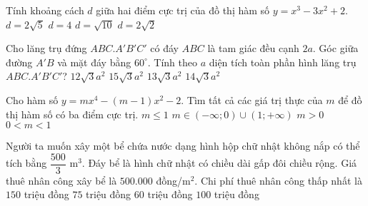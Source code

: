 \begin{ex}%
	Tính khoảng cách $d$ giữa hai điểm cực trị của đồ thị hàm số $y=x^3-3x^2+2$.
	\choice
	{\True $d=2\sqrt{5}$}
	{$d=4$}
	{$d=\sqrt{10}$}
	{$d=2\sqrt{2}$}
\end{ex}

\begin{ex}%
	Cho lăng trụ đứng $ABC.A'B'C'$ có đáy $ABC$ là tam giác đều cạnh $2a$. Góc giữa đường $A'B$ và mặt đáy bằng $60^{\circ}$. Tính theo $a$ diện tích toàn phần hình lăng trụ $ABC.A'B'C'$?
	\choice
	{$12\sqrt{3}a^2$}
	{$15\sqrt{3}a^2$}
	{$13\sqrt{3}a^2$}
	{\True $14\sqrt{3}a^2$}
\end{ex}

\begin{ex}%
	Cho hàm số $y=mx^4-(m-1)x^2-2$. Tìm tất cả các giá trị thực của $m$ để đồ thị hàm số có ba điểm cực trị.
	\choice
	{$m \leq 1$}
	{\True $m \in (-\infty;0) \cup (1;+\infty)$}
	{$m>0$}
	{$0<m<1$}
\end{ex}
 
 
 \begin{ex}%
 	Người ta muốn xây một bể chứa nước dạng hình hộp chữ nhật không nắp có thể tích bằng $\dfrac{500}{3}$ m$^3$. Đáy bể là hình chữ nhật có chiều dài gấp đôi chiều rộng. Giá thuê nhân công xây bể là $500.000$ đồng/m$^2$. Chi phí thuê nhân công thấp nhất là
 	\choice
 	{$150$ triệu đồng}
 	{\True $75$ triệu đồng}
 	{$60$ triệu đồng}
 	{$100$ triệu đồng}
 \end{ex}

